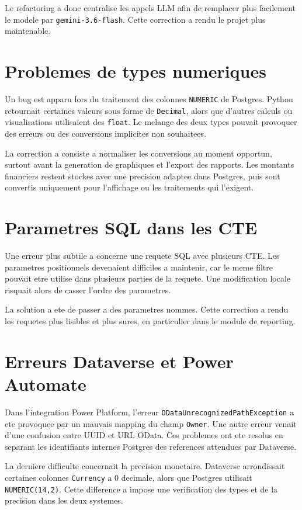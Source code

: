 Le refactoring a donc centralise les appels LLM afin de remplacer plus facilement le modele par \texttt{gemini-3.6-flash}. Cette correction a rendu le projet plus maintenable.

\section{Problemes de types numeriques}

Un bug est apparu lors du traitement des colonnes \texttt{NUMERIC} de Postgres. Python retournait certaines valeurs sous forme de \texttt{Decimal}, alors que d'autres calculs ou visualisations utilisaient des \texttt{float}. Le melange des deux types pouvait provoquer des erreurs ou des conversions implicites non souhaitees.

La correction a consiste a normaliser les conversions au moment opportun, surtout avant la generation de graphiques et l'export des rapports. Les montants financiers restent stockes avec une precision adaptee dans Postgres, puis sont convertis uniquement pour l'affichage ou les traitements qui l'exigent.

\section{Parametres SQL dans les CTE}

Une erreur plus subtile a concerne une requete SQL avec plusieurs CTE. Les parametres positionnels devenaient difficiles a maintenir, car le meme filtre pouvait etre utilise dans plusieurs parties de la requete. Une modification locale risquait alors de casser l'ordre des parametres.

La solution a ete de passer a des parametres nommes. Cette correction a rendu les requetes plus lisibles et plus sures, en particulier dans le module de reporting.

\section{Erreurs Dataverse et Power Automate}

Dans l'integration Power Platform, l'erreur \texttt{ODataUnrecognizedPathException} a ete provoquee par un mauvais mapping du champ \texttt{Owner}. Une autre erreur venait d'une confusion entre UUID et URL OData. Ces problemes ont ete resolus en separant les identifiants internes Postgres des references attendues par Dataverse.

La derniere difficulte concernait la precision monetaire. Dataverse arrondissait certaines colonnes \texttt{Currency} a 0 decimale, alors que Postgres utilisait \texttt{NUMERIC(14,2)}. Cette difference a impose une verification des types et de la precision dans les deux systemes.

